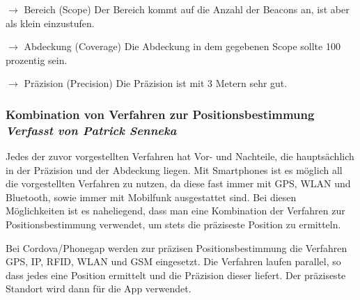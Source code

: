 $\longrightarrow$ Bereich (Scope) Der Bereich kommt auf die Anzahl der Beacons an, ist aber als klein einzustufen.

$\longrightarrow$ Abdeckung (Coverage) Die Abdeckung in dem gegebenen Scope sollte 100 prozentig sein.

$\longrightarrow$ Präzision (Precision) Die Präzision ist mit 3 Metern sehr gut. 






\subsubsection[Kombination von Verfahren zur Positionsbestimmung]{Kombination von Verfahren zur Positionsbestimmung
 \\ \textnormal{\small{\textit {Verfasst von Patrick Senneka}}}}

Jedes der zuvor vorgestellten Verfahren hat Vor- und Nachteile, die hauptsächlich in der Präzision und der Abdeckung liegen.
Mit Smartphones ist es möglich all die vorgestellten Verfahren zu nutzen, da diese fast immer mit GPS, WLAN und Bluetooth, sowie immer mit Mobilfunk ausgestattet sind.
Bei diesen Möglichkeiten ist es naheliegend, dass man eine Kombination der Verfahren zur Positionsbestimmung verwendet, um stets die präziseste Position zu ermitteln. 

Bei Cordova/Phonegap werden zur präzisen Positionsbestimmung die Verfahren GPS, IP, RFID, WLAN und GSM eingesetzt. \cite{phonegap2015}
Die Verfahren laufen parallel, so dass jedes eine Position ermittelt und die Präzision dieser liefert. Der präziseste Standort wird dann für die App verwendet.